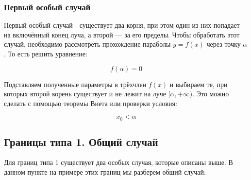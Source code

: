 \subsubsection {Первый особый случай}

Первый особый случай - существует два корня, при этом один из них попадает на включённый конец 
луча, а второй --- за его пределы. Чтобы обработать этот случай, необходимо рассмотреть прохождение
параболы $y = f(x)$ через точку $\alpha$. То есть решить уравнение:

\begin {equation*}
    f(\alpha) = 0
\end {equation*}

Подставляем полученные параметры в трёхчлен $f(x)$ и выбираем те, при которых второй корень 
существует и не лежит на луче $[\alpha, +\infty)$. Это можно сделать с помощью теоремы Виета или
проверки условия:

\begin {equation*}
    x_0 < \alpha
\end {equation*}

\subsection {Границы типа 1. Общий случай}

Для границ типа 1 существует два особых случая, которые описаны выше. В данном пункте на примере 
этих границ мы разберем общий случай: 

